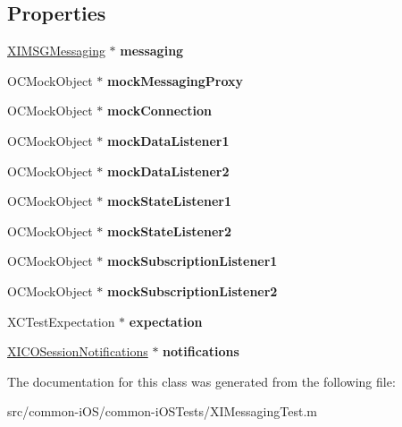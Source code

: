 \subsection*{Properties}
\begin{DoxyCompactItemize}
\item 
\hypertarget{interface_x_i_messaging_test_a9bbaf01b17924d74a32d267df8bc25b6}{}\label{interface_x_i_messaging_test_a9bbaf01b17924d74a32d267df8bc25b6} 
\hyperlink{interface_x_i_m_s_g_messaging}{X\+I\+M\+S\+G\+Messaging} $\ast$ {\bfseries messaging}
\item 
\hypertarget{interface_x_i_messaging_test_a57bc454d3189e01dc02d5d9d3cf5511a}{}\label{interface_x_i_messaging_test_a57bc454d3189e01dc02d5d9d3cf5511a} 
O\+C\+Mock\+Object $\ast$ {\bfseries mock\+Messaging\+Proxy}
\item 
\hypertarget{interface_x_i_messaging_test_a7e6ef1fe77960785b376d5302776712f}{}\label{interface_x_i_messaging_test_a7e6ef1fe77960785b376d5302776712f} 
O\+C\+Mock\+Object $\ast$ {\bfseries mock\+Connection}
\item 
\hypertarget{interface_x_i_messaging_test_ac45ae38021c0d91d71f2fcf40e5d4659}{}\label{interface_x_i_messaging_test_ac45ae38021c0d91d71f2fcf40e5d4659} 
O\+C\+Mock\+Object $\ast$ {\bfseries mock\+Data\+Listener1}
\item 
\hypertarget{interface_x_i_messaging_test_a5359f353b99a5c2933c022333b14100d}{}\label{interface_x_i_messaging_test_a5359f353b99a5c2933c022333b14100d} 
O\+C\+Mock\+Object $\ast$ {\bfseries mock\+Data\+Listener2}
\item 
\hypertarget{interface_x_i_messaging_test_af41715a9498bb694efd9278c0ea3e935}{}\label{interface_x_i_messaging_test_af41715a9498bb694efd9278c0ea3e935} 
O\+C\+Mock\+Object $\ast$ {\bfseries mock\+State\+Listener1}
\item 
\hypertarget{interface_x_i_messaging_test_a0343bed36a42e46b1108e43e54322b32}{}\label{interface_x_i_messaging_test_a0343bed36a42e46b1108e43e54322b32} 
O\+C\+Mock\+Object $\ast$ {\bfseries mock\+State\+Listener2}
\item 
\hypertarget{interface_x_i_messaging_test_ad457e04a00458ef73784a9d24641a6b4}{}\label{interface_x_i_messaging_test_ad457e04a00458ef73784a9d24641a6b4} 
O\+C\+Mock\+Object $\ast$ {\bfseries mock\+Subscription\+Listener1}
\item 
\hypertarget{interface_x_i_messaging_test_ac1977bee18addc20686e4af5268e0d8e}{}\label{interface_x_i_messaging_test_ac1977bee18addc20686e4af5268e0d8e} 
O\+C\+Mock\+Object $\ast$ {\bfseries mock\+Subscription\+Listener2}
\item 
\hypertarget{interface_x_i_messaging_test_a01d1d9dc12822ead4a3bd721773d7231}{}\label{interface_x_i_messaging_test_a01d1d9dc12822ead4a3bd721773d7231} 
X\+C\+Test\+Expectation $\ast$ {\bfseries expectation}
\item 
\hypertarget{interface_x_i_messaging_test_a47c9b63d6cac988603579e83f1d64f6f}{}\label{interface_x_i_messaging_test_a47c9b63d6cac988603579e83f1d64f6f} 
\hyperlink{interface_x_i_c_o_session_notifications}{X\+I\+C\+O\+Session\+Notifications} $\ast$ {\bfseries notifications}
\end{DoxyCompactItemize}


The documentation for this class was generated from the following file\+:\begin{DoxyCompactItemize}
\item 
src/common-\/i\+O\+S/common-\/i\+O\+S\+Tests/X\+I\+Messaging\+Test.\+m\end{DoxyCompactItemize}
